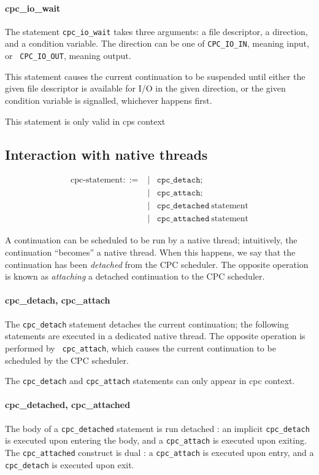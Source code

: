 \documentclass[a4paper]{report}
\begin{document}
\paragraph{cpc\_io\_wait} The statement {\tt cpc\_io\_wait} takes three
arguments: a file descriptor, a direction, and a condition variable.
The direction can be one of {\tt CPC\_IO\_IN}, meaning input, or {\tt
  CPC\_IO\_OUT}, meaning output.

This statement causes the current continuation to be suspended until
either the given file descriptor is available for I/O in the given
direction, or the given condition variable is signalled, whichever
happens first.

This statement is only valid in cps context

\subsection{Interaction with native threads} \label{sec:native-threads}
\begin{eqnarray*}
\mbox{cpc-statement} ::=
 &|& \mathtt{cpc\_detach} \mathtt{;} \\
 &|& \mathtt{cpc\_attach} \mathtt{;} \\
 &|& \mathtt{cpc\_detached}\ \mbox{statement} \\
 &|& \mathtt{cpc\_attached}\ \mbox{statement}
\end{eqnarray*}

A continuation can be scheduled to be run by a native thread; intuitively,
the continuation ``becomes'' a native thread.  When this happens, we say
that the continuation has been {\em detached\/} from the CPC scheduler.
The opposite operation is known as {\em attaching\/} a detached
continuation to the CPC scheduler.

\paragraph{cpc\_detach, cpc\_attach} The {\tt cpc\_detach} statement
detaches the current continuation; the following statements are executed in
a dedicated native thread.  The opposite operation is performed by {\tt
  cpc\_attach}, which causes the current continuation to be scheduled by
the CPC scheduler.

The {\tt cpc\_detach} and {\tt cpc\_attach} statements can only appear in
cpc context.

\paragraph{cpc\_detached, cpc\_attached} The body of a {\tt cpc\_detached}
statement is run detached : an implicit {\tt cpc\_detach} is executed upon
entering the body, and a {\tt cpc\_attach} is executed upon exiting.  The
{\tt cpc\_attached} construct is dual : a {\tt cpc\_attach} is executed
upon entry, and a {\tt cpc\_detach} is executed upon exit.
\end{document}
